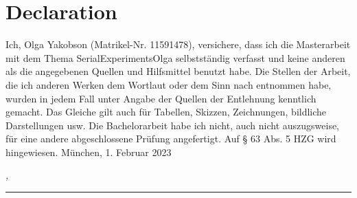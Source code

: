 %
\chapter*{Declaration}
\label{sec:declaration}
\thispagestyle{empty}

Ich, Olga Yakobson (Matrikel-Nr. 11591478), versichere, dass ich die Masterarbeit mit
dem Thema SerialExperimentsOlga selbstständig verfasst und keine
anderen als die angegebenen Quellen und Hilfsmittel benutzt habe. Die Stellen der
Arbeit, die ich anderen Werken dem Wortlaut oder dem Sinn nach entnommen habe,
wurden in jedem Fall unter Angabe der Quellen der Entlehnung kenntlich gemacht.
Das Gleiche gilt auch für Tabellen, Skizzen, Zeichnungen, bildliche Darstellungen
usw. Die Bachelorarbeit habe ich nicht, auch nicht auszugsweise, für eine andere
abgeschlossene Prüfung angefertigt. Auf § 63 Abs. 5 HZG wird hingewiesen.
München, 1. Februar 2023
\bigskip

\noindent\textit{\thesisUniversityCity, \thesisDate}

\smallskip

\begin{flushright}
	\begin{minipage}{5cm}
		\rule{\textwidth}{1pt}
		\centering\thesisName
	\end{minipage}
\end{flushright}

